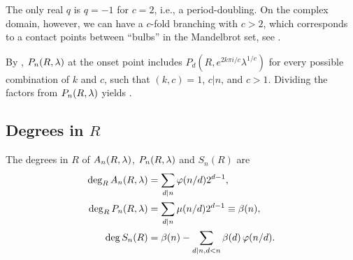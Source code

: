 \documentclass{ws-ijbc}
\begin{document}
\begin{remark}
The only real $q$ is $q = -1$ for $c=2$, i.e., a period-doubling.
%
On the complex domain, however, we can have a $c$-fold branching with $c>2$,
  which corresponds to a contact points between ``bulbs''
  in the Mandelbrot set, see .
\end{remark}


By , $P_n(R, \lambda)$ at the onset point
includes $P_d(R, e^{2 k \pi i/c} \lambda^{1/c})$ for every
  possible combination of $k$ and $c$, such that
  $(k, c) = 1$, $c|n$, and $c > 1$.
%
Dividing the factors from $P_n(R, \lambda)$ yields .










\subsection{\label{sec:degR}Degrees in $R$}



\begin{theorem}
The degrees in $R$ of $A_n(R, \lambda)$, $P_n(R, \lambda)$ and $S_n(R)$ are
\begin{subequations}
\begin{align}
\deg_R A_n(R, \lambda) &= \sum_{d|n} \varphi(n/d) 2^{d-1}, \\
\deg_R P_n(R, \lambda) &= \sum_{d|n} \mu(n/d) 2^{d-1} \equiv \beta(n), \\
\deg S_n(R) &= \beta(n) - \sum_{d | n, d < n} \beta(d) \, \varphi(n/d).
\end{align}
\label{eq:degR}
\end{subequations}
\label{thm:degR}
\end{theorem}
\end{document}
